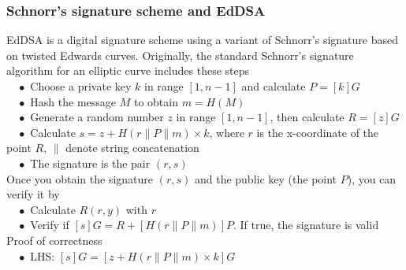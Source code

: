 \subsubsection{Schnorr’s signature scheme and EdDSA}
EdDSA is a digital signature scheme using a variant of Schnorr’s signature based on twisted Edwards curves. Originally, the standard Schnorr’s signature algorithm for an elliptic curve includes these steps\\
$\quad\bullet$ Choose a private key $k$ in range $[1, n -1]$ and calculate $P = [k]G$\\
$\quad\bullet$ Hash the message $M$ to obtain $m = H(M)$\\
$\quad\bullet$ Generate a random number $z$ in range $[1, n -1]$, then calculate $R = [z]G$\\
$\quad\bullet$ Calculate $s = z + H(r \| P \| m) \times k$, where $r$ is the x-coordinate of the point $R$, $\|$ denote string concatenation\\
$\quad\bullet$ The signature is the pair $(r, s)$\\

Once you obtain the signature $(r, s)$ and the public key (the point $P$), you can verify it by\\
$\quad\bullet$ Calculate $R(r, y)$ with $r$\\
$\quad\bullet$ Verify if $[s]G = R + [H(r \| P \| m)]P$. If true, the signature is valid\\

Proof of correctness\\
$\quad\bullet$ LHS: $[s]G = [z + H(r \| P \| m) \times k]G$\\

